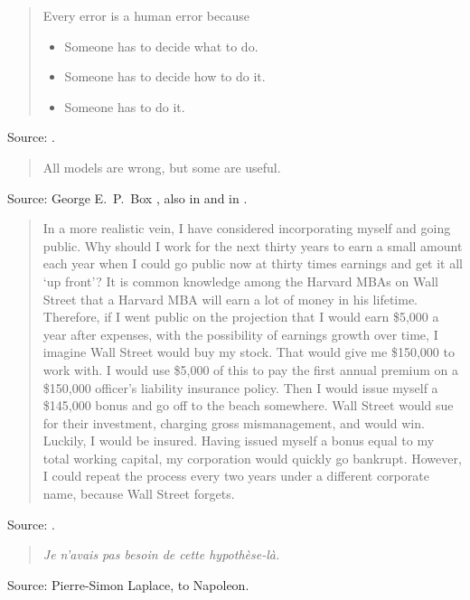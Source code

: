 \documentclass[a4paper]{article}
\begin{document}
\begin{quote}
	Every error is a human error because
	\begin{itemize}
		\item[] Someone has to decide what to do.
		\item[] Someone has to decide how to do it.
		\item[] Someone has to do it.
	\end{itemize}
\end{quote}
Source: \citet[p.~31]{Kletz1996}.
\medskip

\begin{quote}
	All models are wrong, but some are useful.
\end{quote}
Source: George E.~P.~Box \citep[pp.~2--3]{Box1979}, also in \citep{Box1979b} and in
\citet[p.~74]{Box1987}.
\medskip

\begin{quotation}
	In a more realistic vein, I have considered incorporating myself and going public.  Why should
I work for the next thirty years to earn a small amount each year when I could go public now at
thirty times earnings and get it all `up front'?  It is common knowledge among the Harvard MBAs on
Wall Street that a Harvard MBA will earn a lot of money in his lifetime.  Therefore, if I went
public on the projection that I would earn \$5,000 a year after expenses, with the possibility of
earnings growth over time, I imagine Wall Street would buy my stock.  That would give me \$150,000
to work with.  I would use \$5,000 of this to pay the first annual premium on a \$150,000 officer's
liability insurance policy.  Then I would issue myself a \$145,000 bonus and go off to the beach
somewhere.  Wall Street would sue for their investment, charging gross mismanagement, and would
win.  Luckily, I would be insured.  Having issued myself a bonus equal to my total working capital,
my corporation would quickly go bankrupt.  However, I could repeat the process every two years
under a different corporate name, because Wall Street forgets.
\end{quotation}
Source: \citet[p.~171]{Tobias1970}.
\medskip

\begin{quote}
	{\it Je n'avais pas besoin de cette hypoth\`ese-l\`a.}
\end{quote}
Source: Pierre-Simon Laplace, to Napoleon.
\medskip
\end{document}
